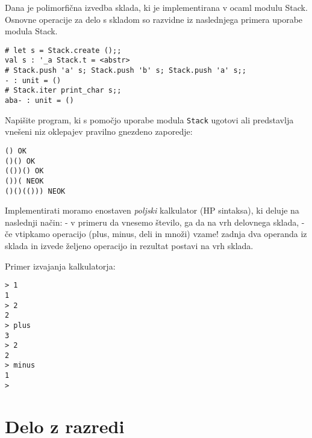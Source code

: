 \begin{ex}
Dana je polimorfi\v cna izvedba sklada, ki je implementirana v ocaml modulu Stack. Osnovne operacije za delo s skladom so razvidne iz naslednjega primera uporabe modula Stack.


\begin{lstlisting}
# let s = Stack.create ();;
val s : '_a Stack.t = <abstr>
# Stack.push 'a' s; Stack.push 'b' s; Stack.push 'a' s;;
- : unit = ()
# Stack.iter print_char s;;
aba- : unit = ()
\end{lstlisting}

Napi\v site program, ki s pomo\v cjo uporabe modula \lstinline{Stack} ugotovi ali predstavlja vne\v seni niz oklepajev pravilno gnezdeno zaporedje:

\begin{lstlisting}
() OK
()() OK
(())() OK
())( NEOK
()()(())) NEOK
\end{lstlisting}

\end{ex}
\begin{ex}
Implementirati moramo enostaven \emph{poljski} kalkulator (HP sintaksa), ki deluje na naslednji na\v cin:
- v primeru da vnesemo \v stevilo, ga da na vrh delovnega sklada,
- \v ce vtipkamo operacijo (plus, minus, deli in mno\v zi) vzame! zadnja dva operanda iz sklada in izvede \v zeljeno operacijo in rezultat postavi na vrh sklada.

Primer izvajanja kalkulatorja:
\begin{lstlisting}
> 1
1
> 2
2
> plus
3
> 2
2
> minus
1
>
\end{lstlisting}
\end{ex}

\chapter{Delo z razredi}

